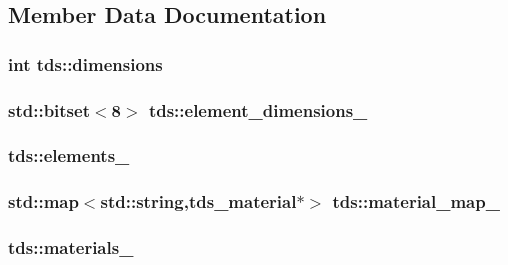 \subsection{Member Data Documentation}
\hypertarget{classtds_ac48ac015df4afa958eac52682954802c}{
\subsubsection[{dimensions}]{\setlength{\rightskip}{0pt plus 5cm}int tds\-::dimensions\hspace{0.3cm}{\ttfamily [protected]}}}\label{classtds_ac48ac015df4afa958eac52682954802c}
\hypertarget{classtds_ae110d4c4170a9197aaac3de482dfd3df}{
\subsubsection[{element\-\_\-dimensions\-\_\-}]{\setlength{\rightskip}{0pt plus 5cm}std\-::bitset$<$8$>$ tds\-::element\-\_\-dimensions\-\_\-\hspace{0.3cm}{\ttfamily [protected]}}}\label{classtds_ae110d4c4170a9197aaac3de482dfd3df}
\hypertarget{classtds_ae68472e797b37e20ac491ac8e6b5b911}{
\subsubsection[{elements\-\_\-}]{ tds\-::elements\-\_\-\hspace{0.3cm}{\ttfamily [protected]}}}\label{classtds_ae68472e797b37e20ac491ac8e6b5b911}
\hypertarget{classtds_a84e25b033be5370a9ebf8446af204189}{
\subsubsection[{material\-\_\-map\-\_\-}]{\setlength{\rightskip}{0pt plus 5cm}std\-::map$<$std\-::string,{\bf tds\-\_\-material}$\ast$$>$ tds\-::material\-\_\-map\-\_\-\hspace{0.3cm}{\ttfamily [protected]}}}\label{classtds_a84e25b033be5370a9ebf8446af204189}
\hypertarget{classtds_a67a9a18e5abe34aa5949862feb142468}{
\subsubsection[{materials\-\_\-}]{ tds\-::materials\-\_\-\hspace{0.3cm}{\ttfamily [protected]}}}\label{classtds_a67a9a18e5abe34aa5949862feb142468}
